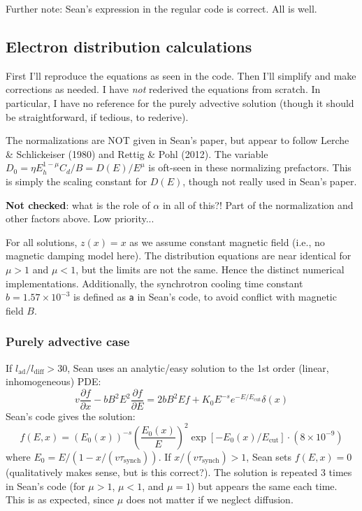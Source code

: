 \documentclass[10pt]{article}
\newcommand{\mt}{\mathrm}
\newcommand{\ptl}{\partial} %
\begin{document}
Further note: Sean's expression in the regular code is correct.  All is well.


\subsection{Electron distribution calculations}

First I'll reproduce the equations as seen in the code.  Then I'll
simplify and make corrections as needed.  I have \emph{not} rederived the
equations from scratch.  In particular, I have no reference for the purely
advective solution (though it should be straightforward, if tedious, to
rederive).



The normalizations are NOT given in Sean's paper, but appear to follow
Lerche \& Schlickeiser (1980) and Rettig \& Pohl (2012).  The variable
$D_0 = \eta E_h^{1-\mu} C_d / B = D(E) / E^\mu$ is oft-seen in these
normalizing prefactors.  This is simply the scaling constant for $D(E)$, though
not really used in Sean's paper.

\textbf{Not checked}: what is the role of $\alpha$ in all of this?!  Part of
the normalization and other factors above.  Low priority...

For all solutions, $z(x) = x$ as we assume constant magnetic field (i.e., no
magnetic damping model here).  The distribution equations are near identical
for $\mu > 1$ and $\mu < 1$, but the limits are not the same.  Hence the
distinct numerical implementations.
Additionally, the synchrotron cooling time constant $b = 1.57 \times 10^{-3}$
is defined as {\tt{a}} in Sean's code, to avoid conflict with magnetic field
$B$.


\subsubsection{Purely advective case}

If $l_{\mt{ad}} / l_{\mt{diff}} > 30$, Sean uses an analytic/easy solution to
the 1st order (linear, inhomogeneous) PDE:
\[
    v \frac{\ptl f}{\ptl x} - b B^2 E^2 \frac{\ptl f}{\ptl E}
    = 2 b B^2 E f + K_0 E^{-s} e^{-E/E_{\mt{cut}}} \delta(x)
\]
Sean's code gives the solution:
\[
    f(E,x) = (E_0(x))^{-s} \left(\frac{E_0(x)}{E}\right)^2
    \exp \left[ -E_0(x)/E_{\mt{cut}} \right] \cdot \left(8\times10^{-9}\right)
\]
where $E_0 = E / (1 - x/(v\tau_{\mt{synch}}))$.
If $x / (v \tau_{\mt{synch}}) > 1$, Sean sets $f(E,x) = 0$ (qualitatively makes
sense, but is this correct?).
The solution is repeated 3 times in Sean's code (for $\mu > 1$, $\mu < 1$, and
$\mu = 1$) but appears the same each time.  This is as expected, since $\mu$
does not matter if we neglect diffusion.
\end{document}
